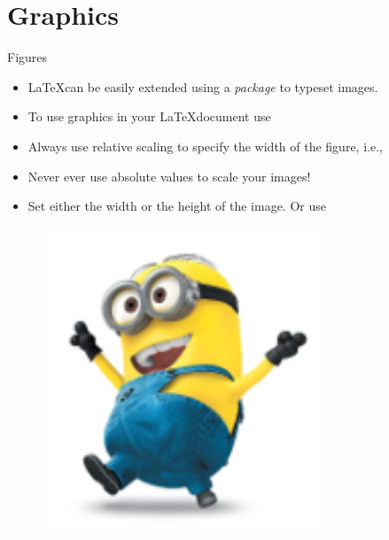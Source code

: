 \documentclass[10pt,times]{beamer}
\subtitle{Part II: Writing papers and thesis using \LaTeX}
\begin{document}
\begin{frame}
  \titlepage
\end{frame}
\section{Graphics}

\begin{frame}[fragile]{Figures}
\begin{itemize}
\item \LaTeX can be easily extended using a \emph{package} to typeset images.

\item To use graphics in your \LaTeX document use 

\item Always use relative scaling to specify the width of the figure, i.e., 

\cmmd{[width = 0.75\bs textwidth]}

\item Never ever use absolute values to scale your images!

\item Set either the width or the height of the image. Or use 

\end{itemize}
\begin{exampletwoup}
\begin{figure}
\includegraphics[width=0.75\textwidth]
                           {figs/minion}
\end{figure}
\end{exampletwoup}
\end{frame}
\end{document}

